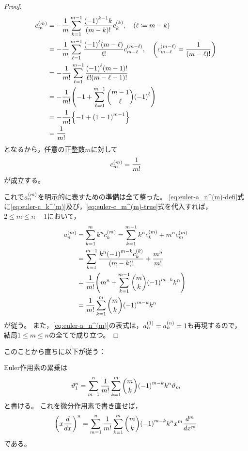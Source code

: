 \documentclass[a4paper,draft]{ltjsarticle}
\begin{document}
\begin{thm}
\begin{proof}
        \begin{align}
            c_m^{\pare{m}}&=-\frac{1}{m}\sum_{k=1}^{m-1}\frac{\pare{-1}^{k-1}k}{\pare{m-k}!}c_k^{\pare{k}},\quad\pare{\ell \coloneqq m-k}
            \\
            &=-\frac{1}{m}\sum_{\ell = 1}^{m-1} \frac{\pare{-1}^{\ell}\pare{m-\ell}}{\ell !}c_{m-\ell}^{\pare{m-\ell}},\quad\pare{c_{m-\ell}^{\pare{m-\ell}}=\frac{1}{\pare{m-\ell}!}}
            \\
            &=-\frac{1}{m!}\sum_{\ell = 1}^{m-1}\frac{\pare{-1}^{\ell} \pare{m-1}!}{\ell! \pare{m-\ell-1}!}
            \\
            &=-\frac{1}{m!}\pare{-1+\sum_{\ell=0}^{m-1}\binom{m-1}{\ell}\pare{-1}^{\ell}}
            \\
            &=-\frac{1}{m!}\bra{-1+\pare{1-1}^{m-1}}
            \\
            &=\frac{1}{m!}
        \end{align}
        となるから，任意の正整数$m$に対して
        \begin{equation}
            c_m^{\pare{m}}=\frac{1}{m!}
            \label{eq:euler-c_m^(m)-true}    
        \end{equation}
        が成立する。

        これで$a_n^{\pare{m}}$を明示的に表すための準備は全て整った。
        \eqref{eq:euler-a_n^(m)-defi}式に\eqref{eq:euler-c_k^(m)}及び，\eqref{eq:euler-c_m^(m)-true}式を代入すれば，$2\leq m\leq n-1$において，
        \begin{align}
            a_n^{\pare{m}}&=\sum_{k=1}^m k^n c_k^{\pare{m}}=\sum_{k=1}^{m-1}k^n c_k^{\pare{m}}+m^n c_m^{\pare{m}}
            \\
            &=\sum_{k=1}^{m-1}\frac{k^n \pare{-1}^{m-k}c_k^{\pare{k}}}{\pare{m-k}!}+\frac{m^n}{m!}
            \\
            &=\frac{1}{m!}\pare{m^n+\sum_{k=1}^{m-1}\binom{m}{k}\pare{-1}^{m-k} k^n}
            \\
            &=\frac{1}{m!}\sum_{k=1}^m\binom{m}{k}\pare{-1}^{m-k} k^n
            \label{eq:euler-a_n^(m)}
        \end{align}
        が従う。
        また，\eqref{eq:euler-a_n^(m)}の表式は，$a_n^{\pare{1}}=a_n^{\pare{n}}=1$も再現するので，結局$1\leq m\leq n$の全てで成り立つ。
    \end{proof}
\end{thm}

このことから直ちに以下が従う：

\begin{thm}\label{thm:euler-vartheta^n}
    Euler作用素の累乗は
    \begin{equation}
        \eu{1}^n=\sum_{m=1}^{n}\frac{1}{m!}\sum_{k=1}^m\binom{m}{k}\pare{-1}^{m-k} k^n\eu{m}
    \end{equation}
    と書ける。
    これを微分作用素で書き直せば，
    \begin{equation}
        \pare{x\diff{}{x}}^n=\sum_{m=1}^{n}\frac{1}{m!}\sum_{k=1}^m\binom{m}{k}\pare{-1}^{m-k} k^n x^m\diffn{}{x}{m}
    \end{equation}
    である。
\end{thm}
\end{document}
